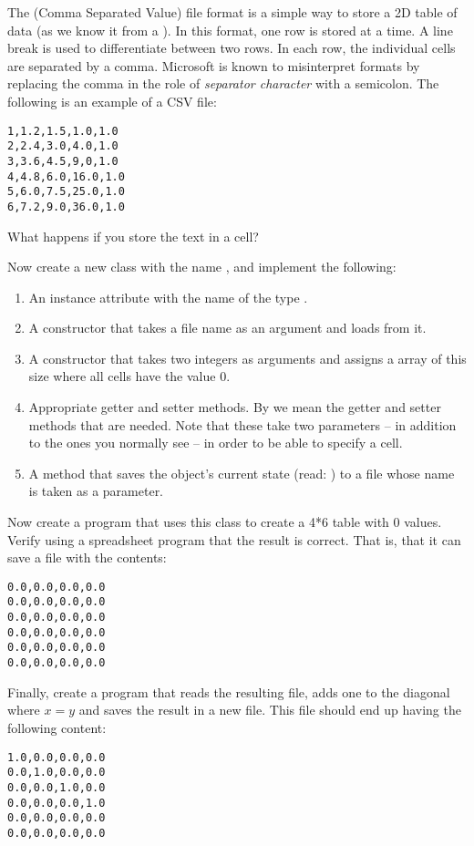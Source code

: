 The  (Comma Separated Value) file format is a simple way to store a 2D table of data (as we know it from a ). In this format, one row is stored at a time. A line break is used to differentiate between two rows. In each row, the individual cells are separated by a comma. Microsoft  is known to misinterpret formats by replacing the comma in the role of \textsl{separator character} with a semicolon. The following is an example of a CSV file:

\begin{verbatim}
1,1.2,1.5,1.0,1.0
2,2.4,3.0,4.0,1.0
3,3.6,4.5,9,0,1.0
4,4.8,6.0,16.0,1.0
5,6.0,7.5,25.0,1.0
6,7.2,9.0,36.0,1.0
\end{verbatim}

What happens if you store the text  in a cell?

Now create a new class with the name , and implement the following:
\begin{enumerate}
  \item An instance attribute with the name  of the type .
  \item A constructor that takes a file name as an argument and loads  from it.
  \item A constructor that takes two integers as arguments and assigns  a  array of this size where all cells have the value 0.
  \item Appropriate getter and setter methods. By  we mean the getter and setter methods that are needed. Note that these take two  parameters -- in addition to the ones you normally see -- in order to be able to specify a cell.
  \item A  method that saves the object's current state (read: ) to a file whose name is taken as a parameter.
\end{enumerate}

Now create a program that uses this class to create a 4*6 table with 0 values. Verify using a spreadsheet program that the result is correct. That is, that it can save a file with the contents:

\begin{verbatim}
0.0,0.0,0.0,0.0
0.0,0.0,0.0,0.0
0.0,0.0,0.0,0.0
0.0,0.0,0.0,0.0
0.0,0.0,0.0,0.0
0.0,0.0,0.0,0.0
\end{verbatim}

Finally, create a program that reads the resulting file, adds one to the diagonal where $x=y$ and saves the result in a new file. This file should end up having the following content:

\begin{verbatim}
1.0,0.0,0.0,0.0
0.0,1.0,0.0,0.0
0.0,0.0,1.0,0.0
0.0,0.0,0.0,1.0
0.0,0.0,0.0,0.0
0.0,0.0,0.0,0.0
\end{verbatim}

